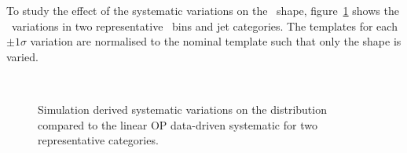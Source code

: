 To study the effect of the systematic variations on the \mht~shape, 
figure~\ref{fig:mcCompHighLow} shows the \mht~variations in two representative \scalht~bins 
and jet categories. The templates for each $\pm 1 \sigma$ variation are normalised to the
nominal template such that only the shape is varied.

\begin{figure}[h!]
  \centering
  ~~
  \\
  \caption{\label{fig:mcCompHighLow}
  Simulation derived systematic variations on the \mht distribution compared to the 
linear OP data-driven systematic for two representative categories.}
\end{figure}

